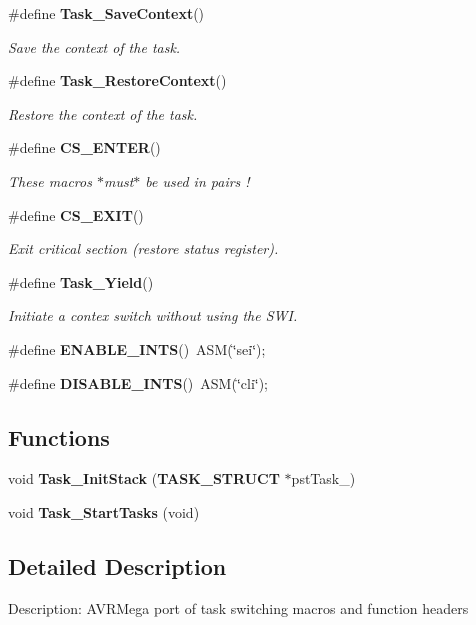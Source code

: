 \begin{DoxyCompactItemize}
\#define {\bf Task\_\-SaveContext}()
\begin{DoxyCompactList}\small\item\em Save the context of the task. \item\end{DoxyCompactList}\item 
\#define {\bf Task\_\-RestoreContext}()
\begin{DoxyCompactList}\small\item\em Restore the context of the task. \item\end{DoxyCompactList}\item 
\#define {\bf CS\_\-ENTER}()
\begin{DoxyCompactList}\small\item\em These macros $\ast$must$\ast$ be used in pairs ! \item\end{DoxyCompactList}\item 
\#define {\bf CS\_\-EXIT}()
\begin{DoxyCompactList}\small\item\em Exit critical section (restore status register). \item\end{DoxyCompactList}\item 
\#define {\bf Task\_\-Yield}()
\begin{DoxyCompactList}\small\item\em Initiate a contex switch without using the SWI. \item\end{DoxyCompactList}\item 
\#define {\bf ENABLE\_\-INTS}()~ASM(\char`\"{}sei\char`\"{});
\item 
\#define {\bf DISABLE\_\-INTS}()~ASM(\char`\"{}cli\char`\"{});
\end{DoxyCompactItemize}
\subsection*{Functions}
\begin{DoxyCompactItemize}
\item 
void {\bf Task\_\-InitStack} ({\bf TASK\_\-STRUCT} $\ast$pstTask\_\-)
\item 
void {\bf Task\_\-StartTasks} (void)
\end{DoxyCompactItemize}


\subsection{Detailed Description}
Description: AVRMega port of task switching macros and function headers 

